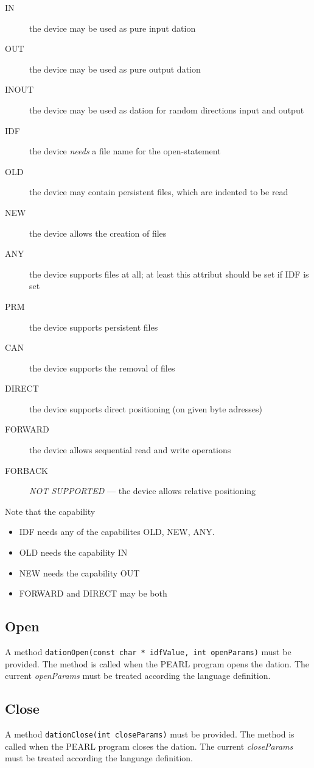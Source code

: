 \begin{description}
\item[IN] the device may be used as pure input dation
\item[OUT] the device may be used as pure output dation
\item[INOUT] the device may be used as dation for random directions
    input and output
\item[IDF] the device {\em needs} a file name for the open-statement
\item[OLD] the device may contain persistent files,
          which are indented to be read
\item[NEW] the device allows the creation of files 
\item[ANY] the device  supports files at all; at least 
            this attribut should be set if IDF is set
\item[PRM] the device supports persistent files
\item[CAN] the device supports the removal of files
\item[DIRECT] the device supports direct positioning (on given byte adresses)
\item[FORWARD] the device allows sequential read and write operations
\item[FORBACK] {\em NOT SUPPORTED} --- the device allows relative positioning
\end{description}
Note that the capability
\begin{itemize}
\item IDF needs any of the capabilites OLD, NEW, ANY.
\item OLD needs the capability IN
\item NEW needs the capability OUT
\item FORWARD and DIRECT may be both
\end{itemize}

\subsection{Open}
A method \verb|dationOpen(const char * idfValue, int openParams)|
must be provided.
The method is called when the PEARL program opens the dation.
The current {\em openParams} must be treated according the language definition.

\subsection{Close}
A method \verb|dationClose(int closeParams)|
must be provided.
The method is called when the PEARL program closes the dation.
The current {\em closeParams} must be treated according the language 
definition.

